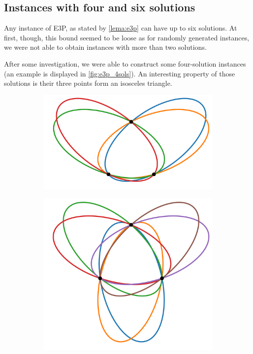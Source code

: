 \subsection{Instances with four and six solutions}

Any instance of E3P, as stated by \autoref{lema:e3p} can have up to six solutions. At first, though, this bound seemed to be loose as for randomly generated instances, we were not able to obtain instances with more than two solutions.

After some investigation, we were able to construct some four-solution instances (an example is displayed in \autoref{fig:e3p_4sols}). An interesting property of those solutions is their three points form an isosceles triangle.

\begin{figure}[!htb]
	\begin{subfigure}{.5\textwidth}
		\centering
		\includegraphics[scale=.28]{../tex/figures/e3p_4sols}
		\caption{}
		\label{fig:e3p_4sols}
	\end{subfigure}
	\begin{subfigure}{.5\textwidth}
		\centering
		\includegraphics[scale=.28]{../tex/figures/e3p_6sols}

\end{subfigure}
\end{figure}
